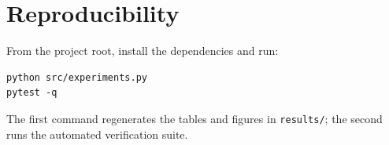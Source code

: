 \documentclass[11pt]{article}
\begin{document}
\section*{Reproducibility}
From the project root, install the dependencies and run:
\begin{lstlisting}
python src/experiments.py
pytest -q
\end{lstlisting}
The first command regenerates the tables and figures in \texttt{results/}; the second runs the automated verification suite.
\end{document}
